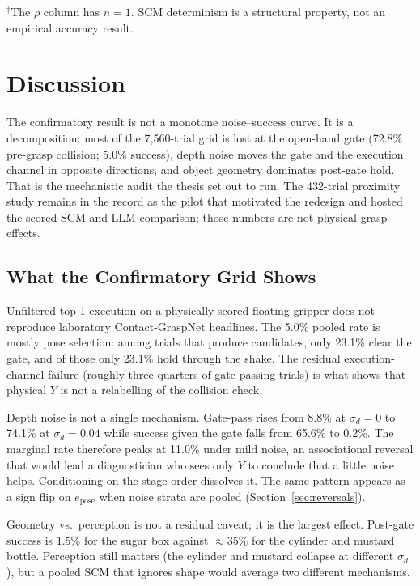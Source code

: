 \documentclass[11pt,a4paper]{report}
\begin{document}
$^\dagger$The $\rho$ column has $n=1$. SCM determinism is a structural property, not an empirical accuracy result.


\chapter{Discussion}
\label{ch:discussion}

The confirmatory result is not a monotone noise--success curve. It is a decomposition: most of the 7{,}560-trial grid is lost at the open-hand gate (72.8\% pre-grasp collision; 5.0\% success), depth noise moves the gate and the execution channel in opposite directions, and object geometry dominates post-gate hold. That is the mechanistic audit the thesis set out to run. The 432-trial proximity study remains in the record as the pilot that motivated the redesign and hosted the scored SCM and LLM comparison; those numbers are not physical-grasp effects.

\section{What the Confirmatory Grid Shows}
\label{sec:observations}

Unfiltered top-1 execution on a physically scored floating gripper does not reproduce laboratory Contact-GraspNet headlines. The 5.0\% pooled rate is mostly pose selection: among trials that produce candidates, only 23.1\% clear the gate, and of those only 23.1\% hold through the shake. The residual execution-channel failure (roughly three quarters of gate-passing trials) is what shows that physical $Y$ is not a relabelling of the collision check.

Depth noise is not a single mechanism. Gate-pass rises from 8.8\% at $\sigma_d = 0$ to 74.1\% at $\sigma_d = 0.04$ while success given the gate falls from 65.6\% to 0.2\%. The marginal rate therefore peaks at 11.0\% under mild noise, an associational reversal that would lead a diagnostician who sees only $Y$ to conclude that a little noise helps. Conditioning on the stage order dissolves it. The same pattern appears as a sign flip on $e_{\text{pose}}$ when noise strata are pooled (Section~\ref{sec:reversals}).

Geometry vs.\ perception is not a residual caveat; it is the largest effect. Post-gate success is 1.5\% for the sugar box against $\approx$35\% for the cylinder and mustard bottle. Perception still matters (the cylinder and mustard collapse at different $\sigma_d$), but a pooled SCM that ignores shape would average two different mechanisms.
\end{document}
